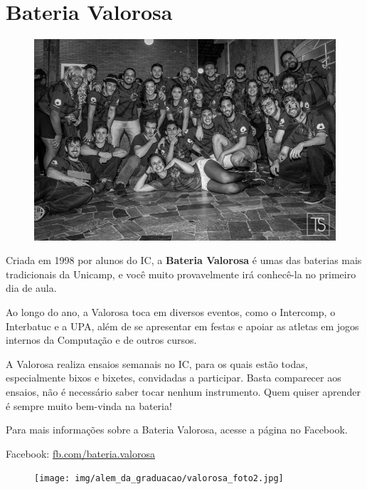 
\section{Bateria Valorosa}

\begin{figure}[H]
    \centering
    \includegraphics[scale=0.27]{img/alem_da_graduacao/valorosa_foto1.jpg}
\end{figure}

Criada em 1998 por alunos do IC, a \textbf{Bateria Valorosa} é umas das baterias
mais tradicionais da Unicamp, e você muito provavelmente irá conhecê-la no
primeiro dia de aula.

Ao longo do ano, a Valorosa toca em diversos eventos, como o Intercomp, o
Interbatuc e a UPA, além de se apresentar em festas e apoiar as atletas em jogos
internos da Computação e de outros cursos.

A Valorosa realiza ensaios semanais no IC, para os quais estão todas,
especialmente bixos e bixetes, convidadas a participar. Basta comparecer aos
ensaios, não é necessário saber tocar nenhum instrumento. Quem quiser aprender é
sempre muito bem-vinda na bateria!

Para mais informações sobre a Bateria Valorosa, acesse a página no Facebook.
\begin{compactitemize}
\item Facebook: \url{fb.com/bateria.valorosa}
\end{compactitemize}

\begin{figure}[H]
    \centering
    \texttt{[image: img/alem\_da\_graduacao/valorosa\_foto2.jpg]}
\end{figure}
